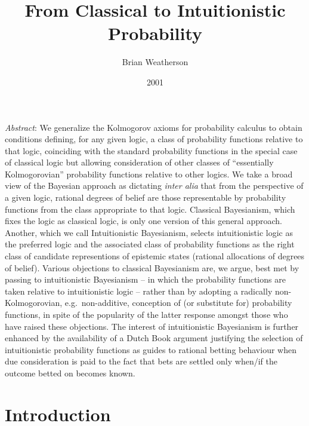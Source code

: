 \documentclass[
  11pt,
  letterpaper,
  DIV=11,
  numbers=noendperiod,
  twoside]{scrartcl}
\title{From Classical to Intuitionistic Probability}
\author{Brian Weatherson}
\date{2001}
\renewenvironment{abstract}
 {\vspace{-1.25cm}
 \quotation\small\noindent\emph{Abstract}:}
 {\endquotation}
\begin{document}
\maketitle
\begin{abstract}
We generalize the Kolmogorov axioms for probability calculus to obtain
conditions defining, for any given logic, a class of probability
functions relative to that logic, coinciding with the standard
probability functions in the special case of classical logic but
allowing consideration of other classes of ``essentially Kolmogorovian''
probability functions relative to other logics. We take a broad view of
the Bayesian approach as dictating \emph{inter alia} that from the
perspective of a given logic, rational degrees of belief are those
representable by probability functions from the class appropriate to
that logic. Classical Bayesianism, which fixes the logic as classical
logic, is only one version of this general approach. Another, which we
call Intuitionistic Bayesianism, selects intuitionistic logic as the
preferred logic and the associated class of probability functions as the
right class of candidate representions of epistemic states (rational
allocations of degrees of belief). Various objections to classical
Bayesianism are, we argue, best met by passing to intuitionistic
Bayesianism -- in which the probability functions are taken relative to
intuitionistic logic -- rather than by adopting a radically
non-Kolmogorovian, e.g.~non-additive, conception of (or substitute for)
probability functions, in spite of the popularity of the latter response
amongst those who have raised these objections. The interest of
intuitionistic Bayesianism is further enhanced by the availability of a
Dutch Book argument justifying the selection of intuitionistic
probability functions as guides to rational betting behaviour when due
consideration is paid to the fact that bets are settled only when/if the
outcome betted on becomes known.
\end{abstract}


\section{Introduction}\label{introduction}
\end{document}

